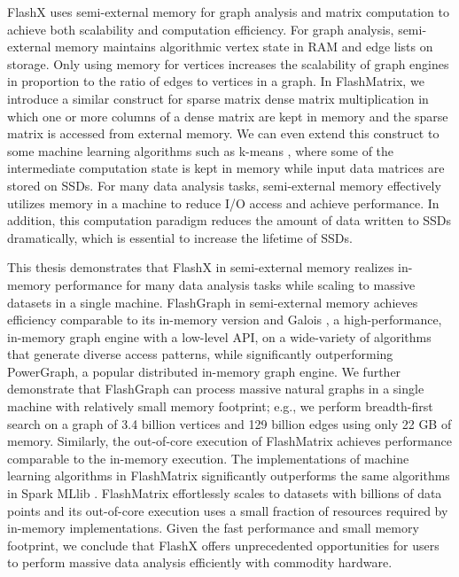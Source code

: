 FlashX uses semi-external memory for graph analysis
and matrix computation to achieve both scalability and computation efficiency.
For graph analysis, semi-external memory \cite{Abello98} maintains algorithmic
vertex state in RAM and edge lists on storage. Only using memory for vertices
increases the scalability of graph engines in proportion to the ratio of edges
to vertices in a graph. In FlashMatrix, we introduce a similar construct for
sparse matrix dense matrix multiplication in which one or more columns of
a dense matrix are kept in memory and the sparse matrix is accessed from
external memory. We can even extend this construct to some machine learning
algorithms such as k-means \cite{kmeans}, where some of the intermediate
computation state is kept in memory while input data matrices are stored on
SSDs. For many data analysis tasks, semi-external memory effectively utilizes
memory in a machine to reduce I/O access and achieve performance. In addition,
this computation paradigm reduces the amount of data written to SSDs
dramatically, which is essential to increase the lifetime of SSDs.

This thesis demonstrates that FlashX in semi-external memory realizes
in-memory performance for many data analysis tasks while scaling to massive
datasets in a single machine. FlashGraph in semi-external memory achieves
efficiency comparable to its in-memory version and Galois \cite{galois},
a high-performance, in-memory graph engine with a low-level API, on
a wide-variety of algorithms that generate diverse access patterns, while
significantly outperforming PowerGraph, a popular distributed in-memory
graph engine. We further demonstrate that FlashGraph can process massive
natural graphs in a single machine with relatively small memory footprint;
e.g., we perform breadth-first search on a graph of 3.4 billion vertices
and 129 billion edges using only 22 GB of memory. Similarly, the out-of-core
execution of FlashMatrix achieves performance comparable to the in-memory
execution. The implementations of machine learning algorithms in FlashMatrix
significantly outperforms the same algorithms in Spark MLlib \cite{mllib}.
FlashMatrix effortlessly scales to datasets with billions of data points and
its out-of-core execution uses a small fraction of resources required by
in-memory implementations. Given the fast performance and small memory footprint,
we conclude that FlashX offers unprecedented opportunities for users to perform
massive data analysis efficiently with commodity hardware.

